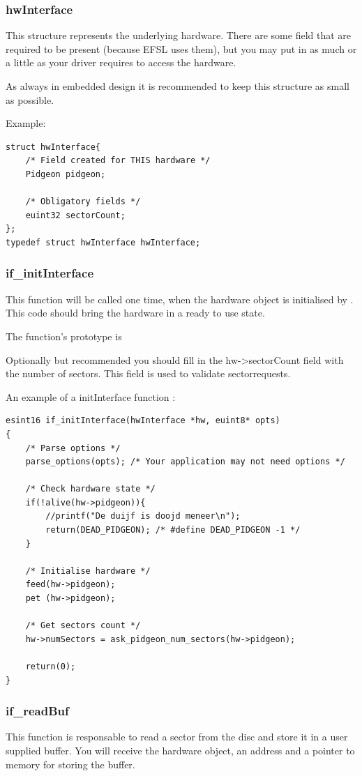 \subsubsection{hwInterface}
This structure represents the underlying hardware. There are some field that are required
to be present (because EFSL uses them), but you may put in as much or a little as
your driver requires to access the hardware.

As always in embedded design it is recommended to keep this structure as small
as possible.

Example:
\begin{lstlisting}
struct hwInterface{
	/* Field created for THIS hardware */
	Pidgeon pidgeon;

	/* Obligatory fields */
	euint32 sectorCount;
};
typedef struct hwInterface hwInterface;
\end{lstlisting}

\subsubsection{if\_initInterface}
This function will be called one time, when the hardware object is initialised by
. This code should bring the hardware in a ready to use state.

The function's prototype is\\

Optionally but recommended you should fill in the hw->sectorCount field with the number
of sectors. This field is used to validate sectorrequests.

An example of a initInterface function :
\begin{lstlisting}
esint16 if_initInterface(hwInterface *hw, euint8* opts)
{
	/* Parse options */
	parse_options(opts); /* Your application may not need options */

	/* Check hardware state */
	if(!alive(hw->pidgeon)){
		//printf("De duijf is doojd meneer\n");
		return(DEAD_PIDGEON); /* #define DEAD_PIDGEON -1 */
	}

	/* Initialise hardware */
	feed(hw->pidgeon);
	pet (hw->pidgeon);

	/* Get sectors count */
	hw->numSectors = ask_pidgeon_num_sectors(hw->pidgeon);

	return(0);
}
\end{lstlisting}

\subsubsection{if\_readBuf}
This function is responsable to read a sector from the disc and store it in a user supplied buffer. You will receive the hardware object, an address and a pointer to memory for storing
the buffer.

